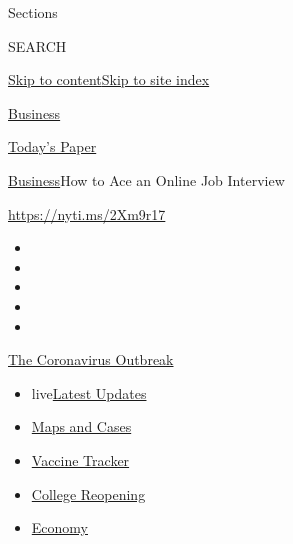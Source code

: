 Sections

SEARCH

\protect\hyperlink{site-content}{Skip to
content}\protect\hyperlink{site-index}{Skip to site index}

\href{https://www.nytimes3xbfgragh.onion/section/business}{Business}

\href{https://myaccount.nytimes3xbfgragh.onion/auth/login?response_type=cookie\&client_id=vi}{}

\href{https://www.nytimes3xbfgragh.onion/section/todayspaper}{Today's
Paper}

\href{/section/business}{Business}\textbar{}How to Ace an Online Job
Interview

\url{https://nyti.ms/2Xm9r17}

\begin{itemize}
\item
\item
\item
\item
\item
\end{itemize}

\href{https://www.nytimes3xbfgragh.onion/news-event/coronavirus?action=click\&pgtype=Article\&state=default\&region=TOP_BANNER\&context=storylines_menu}{The
Coronavirus Outbreak}

\begin{itemize}
\tightlist
\item
  live\href{https://www.nytimes3xbfgragh.onion/2020/08/03/world/coronavirus-covid-19.html?action=click\&pgtype=Article\&state=default\&region=TOP_BANNER\&context=storylines_menu}{Latest
  Updates}
\item
  \href{https://www.nytimes3xbfgragh.onion/interactive/2020/us/coronavirus-us-cases.html?action=click\&pgtype=Article\&state=default\&region=TOP_BANNER\&context=storylines_menu}{Maps
  and Cases}
\item
  \href{https://www.nytimes3xbfgragh.onion/interactive/2020/science/coronavirus-vaccine-tracker.html?action=click\&pgtype=Article\&state=default\&region=TOP_BANNER\&context=storylines_menu}{Vaccine
  Tracker}
\item
  \href{https://www.nytimes3xbfgragh.onion/2020/08/02/us/covid-college-reopening.html?action=click\&pgtype=Article\&state=default\&region=TOP_BANNER\&context=storylines_menu}{College
  Reopening}
\item
  \href{https://www.nytimes3xbfgragh.onion/live/2020/08/03/business/stock-market-today-coronavirus?action=click\&pgtype=Article\&state=default\&region=TOP_BANNER\&context=storylines_menu}{Economy}
\end{itemize}

